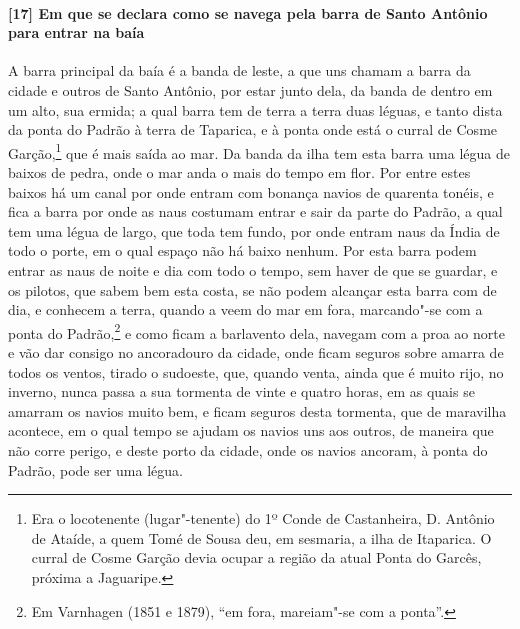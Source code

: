 \begin{linenumbers}
\paragraph{[17] Em que se declara como se navega pela barra de Santo Antônio para entrar na
baía} \quad
A barra principal da baía é a banda de leste, a que uns chamam a barra da cidade e
outros de Santo Antônio, por estar junto dela, da banda de dentro em um alto, sua ermida;
a qual barra tem de terra a terra duas léguas, e tanto dista da ponta do Padrão à terra de
Taparica, e à ponta onde está o curral de Cosme Garção,\footnote{ Era o locotenente
(lugar"-tenente) do 1º Conde de Castanheira, D. Antônio de Ataíde, a quem Tomé de Sousa
deu, em sesmaria, a ilha de Itaparica. O curral de Cosme Garção devia ocupar a região da
atual Ponta do Garcês, próxima a Jaguaripe.} que é mais saída ao mar. Da banda da ilha tem
esta barra uma légua de baixos de pedra, onde o mar anda o mais do tempo em flor. Por
entre estes baixos há um canal por onde entram com bonança navios de quarenta tonéis, e
fica a barra por onde as naus costumam entrar e sair da parte do Padrão, a qual tem uma
légua de largo, que toda tem fundo, por onde entram naus da Índia de todo o porte, em o
qual espaço não há baixo nenhum. Por esta barra podem entrar as naus de noite e dia com
todo o tempo, sem haver de que se guardar, e os pilotos, que sabem bem esta costa, se não
podem alcançar esta barra com de dia, e conhecem a terra, quando a veem do mar em fora,
marcando"-se com a ponta do Padrão,\footnote{ Em Varnhagen (1851 e 1879), ``em fora,
mareiam"-se com a ponta''.} e como ficam a barlavento dela, navegam com a proa ao norte e
vão dar consigo no ancoradouro da cidade, onde ficam seguros sobre amarra de todos os
ventos, tirado o sudoeste, que, quando venta, ainda que é muito rijo, no inverno,
nunca passa a sua tormenta de vinte e quatro horas, em as quais se
amarram os navios muito bem, e ficam seguros desta tormenta, que de maravilha acontece, em
o qual tempo se ajudam os navios uns aos outros, de maneira que não corre perigo, e deste
porto da cidade, onde os navios ancoram, à ponta do Padrão, pode ser uma légua.


\end{linenumbers}
